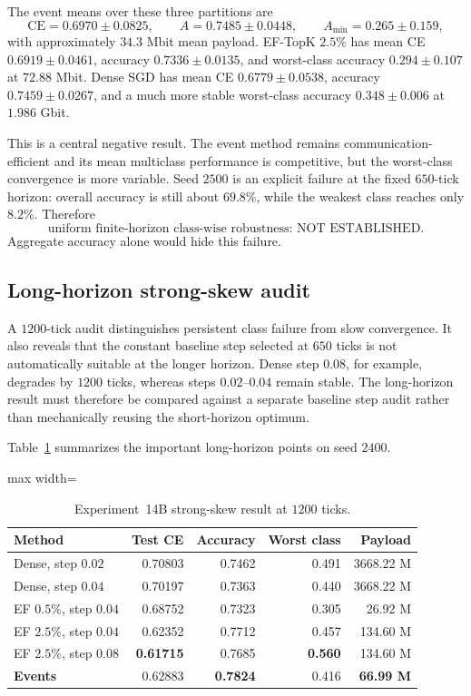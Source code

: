 The event means over these three partitions are
\begin{equation}
\text{CE}=0.6970\pm0.0825,
\qquad
A=0.7485\pm0.0448,
\qquad
A_{\min}=0.265\pm0.159,
\end{equation}
with approximately $34.3$ Mbit mean payload. EF-TopK $2.5\%$ has mean CE $0.6919\pm0.0461$, accuracy $0.7336\pm0.0135$, and worst-class accuracy $0.294\pm0.107$ at $72.88$ Mbit. Dense SGD has mean CE $0.6779\pm0.0538$, accuracy $0.7459\pm0.0267$, and a much more stable worst-class accuracy $0.348\pm0.006$ at $1.986$ Gbit.

This is a central negative result. The event method remains communication-efficient and its mean multiclass performance is competitive, but the worst-class convergence is more variable. Seed $2500$ is an explicit failure at the fixed $650$-tick horizon: overall accuracy is still about $69.8\%$, while the weakest class reaches only $8.2\%$. Therefore
\begin{equation}
\boxed{\text{uniform finite-horizon class-wise robustness: NOT ESTABLISHED}.}
\end{equation}
Aggregate accuracy alone would hide this failure.

\subsection{Long-horizon strong-skew audit}

A $1200$-tick audit distinguishes persistent class failure from slow convergence. It also reveals that the constant baseline step selected at $650$ ticks is not automatically suitable at the longer horizon. Dense step $0.08$, for example, degrades by $1200$ ticks, whereas steps $0.02$--$0.04$ remain stable. The long-horizon result must therefore be compared against a separate baseline step audit rather than mechanically reusing the short-horizon optimum.

Table~\ref{tab:exp14b-long} summarizes the important long-horizon points on seed $2400$.

\begin{table}[t]
\centering
\caption{Experiment~14B strong-skew result at $1200$ ticks.}
\label{tab:exp14b-long}
\begin{adjustbox}{max width=\textwidth}
\begin{tabular}{lrrrr}
\toprule
Method & Test CE & Accuracy & Worst class & Payload\\
\midrule
Dense, step $0.02$ & 0.70803 & 0.7462 & 0.491 & 3668.22 M\\
Dense, step $0.04$ & 0.70197 & 0.7363 & 0.440 & 3668.22 M\\
EF $0.5\%$, step $0.04$ & 0.68752 & 0.7323 & 0.305 & 26.92 M\\
EF $2.5\%$, step $0.04$ & 0.62352 & 0.7712 & 0.457 & 134.60 M\\
EF $2.5\%$, step $0.08$ & \textbf{0.61715} & 0.7685 & \textbf{0.560} & 134.60 M\\
\textbf{Events} & 0.62883 & \textbf{0.7824} & 0.416 & \textbf{66.99 M}\\
\bottomrule
\end{tabular}
\end{adjustbox}
\end{table}

